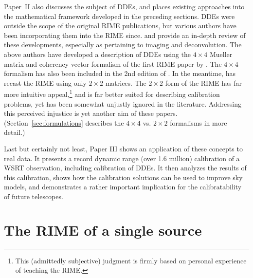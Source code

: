 \documentclass{aa}
\begin{document}
Paper~II also discusses the subject of DDEs, and places existing approaches into the mathematical framework developed in the preceding sections. DDEs were outside the scope of the original RIME publications, but various authors have been incorporating them into the RIME since. \citet{Rau:DDEs} and \citet{SB:calibration-low-freq} provide an in-depth review of these developments, especially as pertaining to imaging and deconvolution. The above authors have developed a description of DDEs using the $4\times4$ Mueller matrix and coherency vector formalism of the first RIME paper by \citet{ME1}. The $4\times4$ formalism has also been included in the 2nd edition of \citet*[Sect.~4.8]{tms}. In the meantime, \citet{ME4} has recast the RIME using only $2\times2$ matrices. The $2\times2$ form of the RIME has far more intuitive appeal,\footnote{This (admittedly subjective) judgment is firmly based on personal experience of teaching the RIME.} and is far better suited for describing calibration problems, yet has been somewhat unjustly ignored in the literature. Addressing this perceived injustice is yet another aim of these papers. (Section~\ref{sec:formulations} describes the $4\times4$ vs. $2\times2$ formalisms in more detail.)

Last but certainly not least, Paper III \citep{RRIME3} shows an application of these concepts to real data. It presents a record dynamic range (over 1.6 million) calibration of a WSRT observation, including calibration of DDEs. It then analyzes the results of this calibration, shows how the calibration solutions can be used to improve sky models, and demonstrates a rather important implication for the calibratability of future telescopes.

\section{The RIME of a single source\label{sec:me-single-source}}
\label{sec:derivation}
\end{document}
